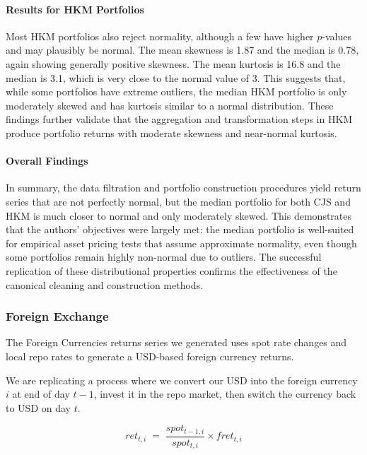 \documentclass{article}
\begin{document}
\begin{appendices}
\paragraph{Results for HKM Portfolios}
Most HKM portfolios also reject normality, although a few have higher $p$-values and may plausibly be normal. The mean skewness is 1.87 and the median is 0.78, again showing generally positive skewness. The mean kurtosis is 16.8 and the median is 3.1, which is very close to the normal value of 3. This suggests that, while some portfolios have extreme outliers, the median HKM portfolio is only moderately skewed and has kurtosis similar to a normal distribution. These findings further validate that the aggregation and transformation steps in HKM produce portfolio returns with moderate skewness and near-normal kurtosis.

\paragraph{Overall Findings}
In summary, the data filtration and portfolio construction procedures yield return series that are not perfectly normal, but the median portfolio for both CJS and HKM is much closer to normal and only moderately skewed. This demonstrates that the authors' objectives were largely met: the median portfolio is well-suited for empirical asset pricing tests that assume approximate normality, even though some portfolios remain highly non-normal due to outliers. The successful replication of these distributional properties confirms the effectiveness of the canonical cleaning and construction methods.



\subsubsection{Foreign Exchange}
\label{sec:fx}
The Foreign Currencies returns series we generated uses spot rate changes and local repo rates to generate a USD-based
foreign currency returns. 

We are replicating a process where we convert our USD into the foreign currency $i$ at end of day $t - 1$, 
invest it in the repo market, then switch the currency back to USD on day $t$. 

\begin{equation}
  ret_{t, i} \;=\; \frac{spot_{t - 1, i}}{spot_{t, i}} \times fret_{t, i}
\end{equation}


\end{appendices}
\end{document}
